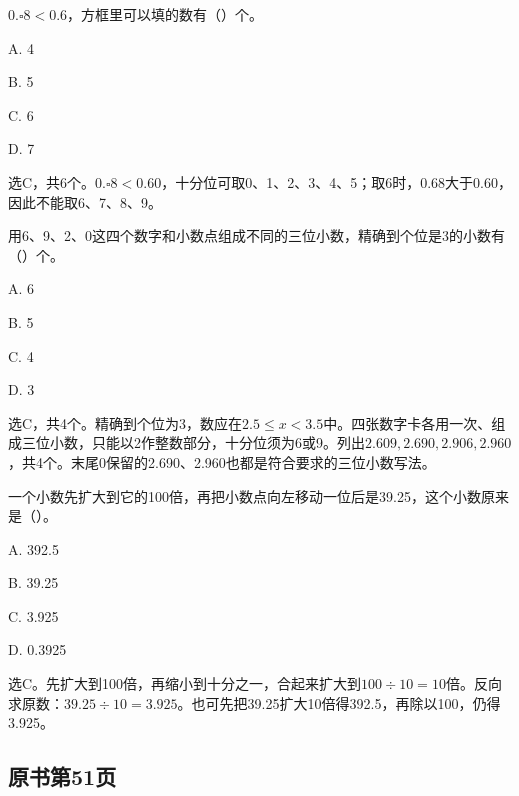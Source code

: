 \(0.\square8<0.6\)，方框里可以填的数有（\hspace{1.8em}）个。\par
\noindent A. 4\par
\noindent B. 5\par
\noindent C. 6\par
\noindent D. 7\par
\begin{BookAnswer}
选C，共6个。\(0.\square8<0.60\)，十分位可取0、1、2、3、4、5；取6时，0.68大于0.60，因此不能取6、7、8、9。
\end{BookAnswer}

用6、9、2、0这四个数字和小数点组成不同的三位小数，精确到个位是3的小数有（\hspace{1.8em}）个。\par
\noindent A. 6\par
\noindent B. 5\par
\noindent C. 4\par
\noindent D. 3\par
\begin{BookAnswer}
选C，共4个。精确到个位为3，数应在\(2.5\le x<3.5\)中。四张数字卡各用一次、组成三位小数，只能以2作整数部分，十分位须为6或9。列出\(2.609,2.690,2.906,2.960\)，共4个。末尾0保留的2.690、2.960也都是符合要求的三位小数写法。
\end{BookAnswer}

一个小数先扩大到它的100倍，再把小数点向左移动一位后是39.25，这个小数原来是（\hspace{1.8em}）。\par
\noindent A. 392.5\par
\noindent B. 39.25\par
\noindent C. 3.925\par
\noindent D. 0.3925\par
\begin{BookAnswer}
选C。先扩大到100倍，再缩小到十分之一，合起来扩大到\(100\div10=10\)倍。反向求原数：\(39.25\div10=3.925\)。也可先把39.25扩大10倍得392.5，再除以100，仍得3.925。
\end{BookAnswer}



\subsection*{原书第51页}

